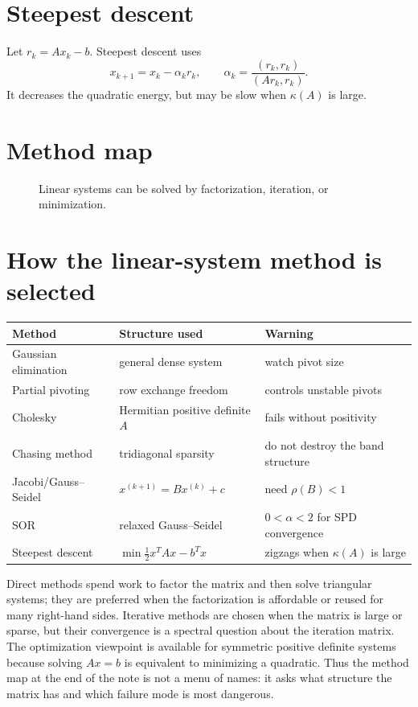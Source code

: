 \section{Steepest descent}
Let \(r_k=Ax_k-b\).  Steepest descent uses
\[
  x_{k+1}=x_k-\alpha_k r_k,\qquad
  \alpha_k=\frac{(r_k,r_k)}{(Ar_k,r_k)}.
\]
It decreases the quadratic energy, but may be slow when \(\kappa(A)\) is large.

\section{Method map}
\begin{figure}[H]
\centering
{}
\caption{Linear systems can be solved by factorization, iteration, or minimization.}
\end{figure}

\section{How the linear-system method is selected}
\begin{center}
\small
\begin{tabularx}{\textwidth}{@{}lYY@{}}
\toprule
Method & Structure used & Warning\\
\midrule
Gaussian elimination & general dense system & watch pivot size\\
Partial pivoting & row exchange freedom & controls unstable pivots\\
Cholesky & Hermitian positive definite \(A\) & fails without positivity\\
Chasing method & tridiagonal sparsity & do not destroy the band structure\\
Jacobi/Gauss--Seidel & \(x^{(k+1)}=Bx^{(k)}+c\) & need \(\rho(B)<1\)\\
SOR & relaxed Gauss--Seidel & \(0<\alpha<2\) for SPD convergence\\
Steepest descent & \(\min \frac12x^TAx-b^Tx\) & zigzags when \(\kappa(A)\) is large\\
\bottomrule
\end{tabularx}
\end{center}
Direct methods spend work to factor the matrix and then solve triangular systems; they are preferred when the factorization is affordable or reused for many right-hand sides.  Iterative methods are chosen when the matrix is large or sparse, but their convergence is a spectral question about the iteration matrix.  The optimization viewpoint is available for symmetric positive definite systems because solving \(Ax=b\) is equivalent to minimizing a quadratic.  Thus the method map at the end of the note is not a menu of names: it asks what structure the matrix has and which failure mode is most dangerous.
